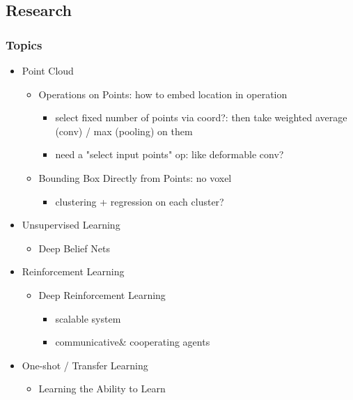 \subsection{Research}
\subsubsection{Topics}
\begin{itemize}
\item Point Cloud
	\begin{itemize}
	\item Operations on Points: how to embed location in operation
		\begin{itemize}
		\item select fixed number of points via coord?: then take weighted average (conv) / max (pooling) on them
		\item need a "select input points" op: like deformable conv?
		\end{itemize}
	\item Bounding Box Directly from Points: no voxel
		\begin{itemize}
		\item clustering + regression on each cluster?
		\end{itemize}
	\end{itemize}
	
\item Unsupervised Learning
	\begin{itemize}
	\item Deep Belief Nets
	\end{itemize}

\item Reinforcement Learning
	\begin{itemize}
	\item Deep Reinforcement Learning
		\begin{itemize}
		\item scalable system
		\item communicative\& cooperating agents
		\end{itemize}
	\end{itemize}

\item One-shot / Transfer Learning
	\begin{itemize}
	\item Learning the Ability to Learn
	\end{itemize}


\end{itemize}
